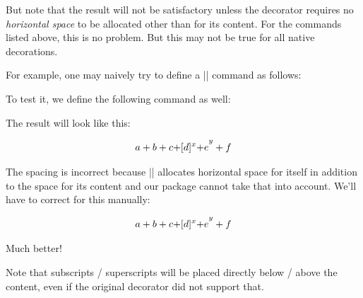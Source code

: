 \documentclass[a4paper]{packagedoc}
\begin{document}
\let\UOLoverline\relax
\begin{latex-example}
\newUOLdecorator\UOLoverline{\overline{#1}}
\end{latex-example}

\noindent But note that the result will not be satisfactory unless the decorator
requires no \emph{horizontal space} to be allocated other than for its
content. For the commands listed above, this is no problem. But this
may not be true for all native decorations.

For example, one may naively try to define a |\UOLfbox| command as follows:

\begin{latex-example}
\newUOLdecorator{}
\end{latex-example}

\noindent To test it, we define the following command as well:

\begin{latex-example}
\newcommand\bigstrut{\vrule height 10pt depth 4pt width 0pt}
\end{latex-example}

\noindent The result will look like this:

\begin{latex-example-show}
\[ a + \UOLfbox{b +c +}[d]^x \UOLfbox{\bigstrut + e}^y + f \]
\end{latex-example-show}

\noindent The spacing is incorrect because |\fbox| allocates horizontal space for itself
in addition to the space for its content and our package cannot take that into
account. We'll have to correct for this manually:

\let\UOLfbox\relax
\begin{latex-example}
\newUOLdecorator\UOLfbox{{%
    \fboxsep=1.2pt \fboxrule=.8pt%
    \kern-\fboxrule \kern-\fboxsep%
    \fbox{$#1$}%
    \kern-\fboxsep  \kern-\fboxrule%
}}
\end{latex-example}

\begin{latex-example-show}
\[ a + \UOLfbox{b +c +}[d]^x \UOLfbox{\bigstrut + e}^y + f \]
\end{latex-example-show}

\noindent Much better!

Note that subscripts / superscripts will be placed directly
below / above the content, even if the original decorator did not
support that.
\end{document}
